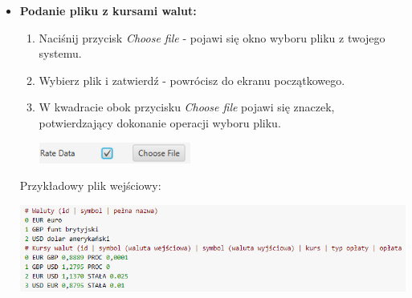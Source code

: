 \documentclass[a4paper,11pt]{article}
\begin{document}
\begin{itemize}
\item \textbf{Podanie pliku z kursami walut:}
\begin{enumerate}
\item Naciśnij przycisk \textit{Choose file} - pojawi się okno wyboru pliku z twojego systemu.
\item Wybierz plik i zatwierdź - powrócisz do ekranu początkowego.
\item W kwadracie obok przycisku \textit{Choose file} pojawi się znaczek, potwierdzający dokonanie operacji wyboru pliku.

\includegraphics[width=5cm]{FileChosen}
\end{enumerate}
Przykładowy plik wejściowy:

\includegraphics[width= 16cm]{FileFormat}


\end{itemize}
\end{document}

